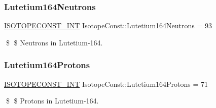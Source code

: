 \subsubsection{\texorpdfstring{Lutetium164\+Neutrons}{Lutetium164Neutrons}}
{\footnotesize\ttfamily \mbox{\hyperlink{group___isotope_const-_macros_ga5f18360b3e99483a35c32d789e62621c}{I\+S\+O\+T\+O\+P\+E\+C\+O\+N\+S\+T\+\_\+\+I\+NT}} Isotope\+Const\+::\+Lutetium164\+Neutrons = 93}

\$ \$ Neutrons in Lutetium-\/164. \mbox{\label{group___isotope_const-_lutetium-_lu164_ga051951f4948d03b1e16452f3893f8ca0}} 
\subsubsection{\texorpdfstring{Lutetium164\+Protons}{Lutetium164Protons}}
{\footnotesize\ttfamily \mbox{\hyperlink{group___isotope_const-_macros_ga5f18360b3e99483a35c32d789e62621c}{I\+S\+O\+T\+O\+P\+E\+C\+O\+N\+S\+T\+\_\+\+I\+NT}} Isotope\+Const\+::\+Lutetium164\+Protons = 71}

\$ \$ Protons in Lutetium-\/164. 